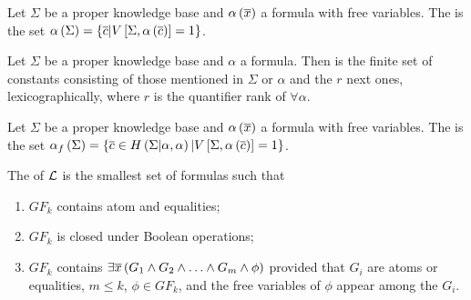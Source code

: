 \begin{defi}
Let $\Sigma$ be a proper knowledge base and $\alpha\left(\overline{x}\right)$ a formula with free variables. The  is the set $\alpha\left(\Sigma\right)=\left\{ \overline{c}|V\left[ \Sigma,\alpha\left(\overline{c}\right)\right]=1\right\}$.
\cite{conf/ijcai/LiuL03}
\end{defi}

\begin{defi}
Let $\Sigma$ be a proper knowledge base and $\alpha$ a formula. Then  is the finite set of constants consisting of those mentioned in $\Sigma$ or $\alpha$ and the $r$ next ones, lexicographically, where $r$ is the quantifier rank of $\forall\alpha$.
\cite{conf/ijcai/LiuL03}
\end{defi}

\begin{defi}
Let $\Sigma$ be a proper knowledge base and $\alpha\left(\overline{x}\right)$ a formula with free variables. The  is the set $\alpha_f\left(\Sigma\right)=\left\{ \overline{c}\in H\left(\Sigma|\alpha,\alpha\right)|V\left[ \Sigma,\alpha\left(\overline{c}\right)\right]=1\right\}$.
\cite{conf/ijcai/LiuL03}
\end{defi}

\begin{defi}
The  of $\mathcal{L}$ is the smallest set of formulas such that
\begin{enumerate}
 \item $GF_k$ contains atom and equalities;
 \item $GF_k$ is closed under Boolean operations;
 \item $GF_k$ contains $\exists\overline{x}\left( G_1\wedge G_2\wedge\ldots\wedge G_m\wedge\phi\right)$ provided that $G_i$ are atoms or equalities, $m\leq k$, $\phi\in GF_k$, and the free variables of $\phi$ appear among the $G_i$.
\end{enumerate}
\cite{conf/ijcai/LiuL03}
\end{defi}

